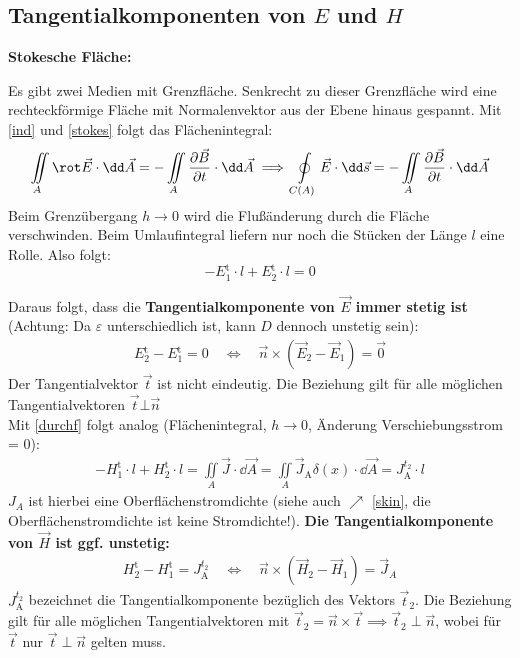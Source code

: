   \subsection{Tangentialkomponenten von ${E}$ und ${H}$}
	  \textbf{Stokesche Fläche:}
	  \begin{center}
		  \resizebox{.5\textwidth}{!}{}
	  \end{center}
		Es gibt zwei Medien mit Grenzfläche. Senkrecht zu dieser Grenzfläche wird eine rechteckförmige Fläche mit Normalenvektor aus der Ebene hinaus gespannt.
		  Mit \ref{ind} und \ref{stokes} folgt das Flächenintegral:
		        $$\iint\limits_{A}\rot \vec{E}\cdot \dd\vec{A}= -\iint\limits_{A}\dfrac{\partial \vec{B} }{\partial t}\cdot \dd\vec{A}\implies\oint\limits_{C(A)}\vec{E}\cdot\dd\vec{s}= -\iint\limits_{A}\dfrac{\partial \vec{B} }{\partial t}\cdot\dd\vec{A}$$
		   Beim Grenzübergang $h\to0$ wird die Flußänderung durch die Fläche verschwinden. Beim Umlaufintegral liefern nur noch die Stücken der Länge $l$ eine Rolle. Also folgt:
		$$-E{}_{1}^{\text{t}}\cdot l + E{}_{2}^{\text{t}}\cdot l = 0$$

		   Daraus folgt, dass die \textbf{Tangentialkomponente von $\vec{E}$ immer stetig ist} (Achtung: Da $\varepsilon$ unterschiedlich ist, kann $D$ dennoch unstetig sein):
		        \begin{equation}\label{tanE}\begin{split}
				        \boxed{E{}_2^\text{t} - E{}_1^\text{t} = 0 \quad \Leftrightarrow \quad \vec{n}\times\left(\vec{{E}}_2-\vec{E}_1\right)=\vec{0}}
			        \end{split}\end{equation}
		   Der Tangentialvektor $\vec{t}$ ist nicht eindeutig. Die Beziehung gilt
		        für alle möglichen Tangentialvektoren $\vec{t}\bot \vec{n}$ \\
			Mit \ref{durchf} folgt analog (Flächenintegral, $h\to 0$, Änderung Verschiebungsstrom = 0):
		        \begin{equation*}\begin{split}
				        -H_{1}^{\text{t}}\cdot l + H_{2}^{\text{t}}\cdot l = \iint\limits_{A}\vec
				        {J}\cdot \dd\vec{A}= \iint\limits_{A}\vec{J}_{\mathrm{A}}\delta(x) \cdot\dd
				        \vec{A}= J_{\mathrm{A}}^{t_2} \cdot l
			        \end{split}\end{equation*}
		 $J_A$ ist hierbei eine Oberflächenstromdichte (siehe auch $\nearrow$ \ref{skin}, die Oberflächenstromdichte ist keine Stromdichte!). \textbf{Die Tangentialkomponente von $\vec{H}$ ist ggf. unstetig:}
		        \begin{equation}\begin{split}\label{tanH}
				        \boxed{H_2^\text{t} - H_1^\text{t} = J_\mathrm{A}^{t_2}\quad \Leftrightarrow \quad \vec{n} \times \left(\vec{H}_2 - \vec{H}_1 \right) =\vec{J}_{A}}
			        \end{split}\end{equation}
		  $J_\mathrm{A}^{t_2}$ bezeichnet die Tangentialkomponente bezüglich des Vektors $\vec{t}_2$. Die Beziehung gilt für alle möglichen Tangentialvektoren mit $\vec{t}_{2}
			        = \vec{n}\times \vec{t} \implies \vec{t}_2\perp\vec{n}$, wobei für $\vec{t}$ nur $\vec{t}\perp\vec{n}$ gelten muss.
